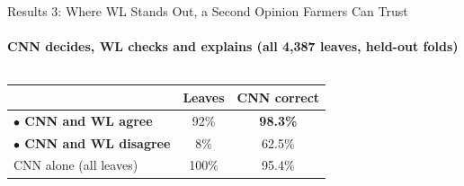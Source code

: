 \documentclass[aspectratio=169, 11pt]{beamer}
\begin{document}
\begin{frame}{Results 3: Where WL Stands Out, a Second Opinion Farmers Can Trust}
    \framesubtitle{CNN decides, WL checks and explains (all 4,387 leaves, held-out folds)}

    \begin{columns}[T, onlytextwidth]
        \small
        \renewcommand{\arraystretch}{1.2}
        \begin{tabular}{@{}l c c@{}}
            \toprule
            & \textbf{Leaves} & \textbf{CNN correct} \\
            \midrule
            \textcolor{green!50!black}{\textbf{$\bullet$ CNN and WL agree}} & 92\% & \textbf{98.3\%} \\
            \textcolor{orange!90!black}{\textbf{$\bullet$ CNN and WL disagree}} & 8\% & 62.5\% \\
            \midrule
            CNN alone (all leaves) & 100\% & 95.4\% \\
            \bottomrule
        \end{tabular}

        
    \end{columns}

    \vspace{0.1cm}
    \centering
    
\end{frame}
\end{document}
